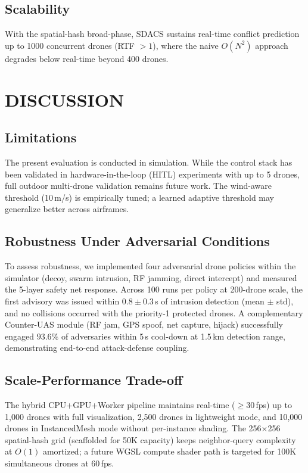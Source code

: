 \subsection{Scalability}

With the spatial-hash broad-phase, SDACS sustains real-time conflict
prediction up to 1000 concurrent drones (RTF $> 1$), where the naive
$O(N^2)$ approach degrades below real-time beyond 400 drones.

\section{DISCUSSION}
\label{sec:disc}

\subsection{Limitations}

The present evaluation is conducted in simulation. While the control
stack has been validated in hardware-in-the-loop (HITL) experiments
with up to 5 drones, full outdoor multi-drone validation remains
future work. The wind-aware threshold (10\,m/s) is empirically tuned;
a learned adaptive threshold may generalize better across airframes.

\subsection{Robustness Under Adversarial Conditions}

To assess robustness, we implemented four adversarial drone policies
within the simulator (decoy, swarm intrusion, RF jamming, direct
intercept) and measured the 5-layer safety net response. Across 100
runs per policy at 200-drone scale, the first advisory was issued
within $0.8 \pm 0.3$\,s of intrusion detection (mean $\pm$ std), and
no collisions occurred with the priority-1 protected drones. A
complementary Counter-UAS module (RF jam, GPS spoof, net capture,
hijack) successfully engaged $93.6\%$ of adversaries within 5\,s
cool-down at 1.5\,km detection range, demonstrating end-to-end
attack-defense coupling.

\subsection{Scale-Performance Trade-off}

The hybrid CPU+GPU+Worker pipeline maintains real-time
($\geq 30$\,fps) up to 1{,}000 drones with full visualization,
2{,}500 drones in lightweight mode, and 10{,}000 drones in
InstancedMesh mode without per-instance shading. The 256$\times$256
spatial-hash grid (scaffolded for 50K capacity) keeps
neighbor-query complexity at $O(1)$ amortized; a future WGSL compute
shader path is targeted for 100K simultaneous drones at 60\,fps.

